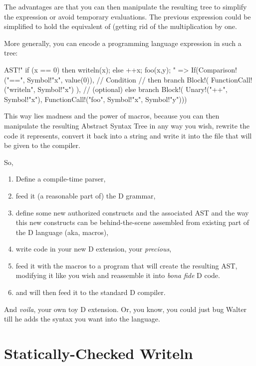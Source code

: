 The advantages are that you can then manipulate the resulting tree to simplify the expression or avoid temporary evaluations. The previous expression could be simplified to hold the equivalent of  (getting rid of the multiplication by one.

More generally, you can encode a programming language expression in such a tree:

\begin{dcode}
AST!"
if (x == 0) 
then 
{ 
    writeln(x);
} 
else 
{ 
    ++x;
    foo(x,y);
}"
=>
If(Comparison!("==", Symbol!"x", value(0)), // Condition
// then branch
   Block!( FunctionCall!("writeln", Symbol!"x") ),
// (optional) else branch
   Block!( Unary!("++", Symbol!"x"),
           FunctionCall!("foo", Symbol!"x", Symbol!"y")))
\end{dcode}

This way lies madness and the power of macros, because you can then manipulate the resulting Abstract Syntax Tree in any way you wish, rewrite the code it represents, convert it back into a string and write it into the file that will be given to the compiler. 

So,

\begin{enumerate}
\item Define a compile-time parser,
\item feed it (a reasonable part of) the D grammar,
\item define some new authorized constructs and the associated AST and the way this new constructs can be behind-the-scene assembled from existing part of the D language (aka, macros),
\item write code in your new D extension, your \emph{precious},
\item feed it with the macros to a program that will create the resulting AST, modifying it like you wish and reassemble it into \emph{bona fide} D code.
\item and will then feed it to the standard D compiler.
\end{enumerate}

And \emph{voila}, your own toy D extension. Or, you know, you could just bug Walter till he adds the syntax you want into the language.

\section{Statically-Checked Writeln}\label{staticallycheckedwriteln}

